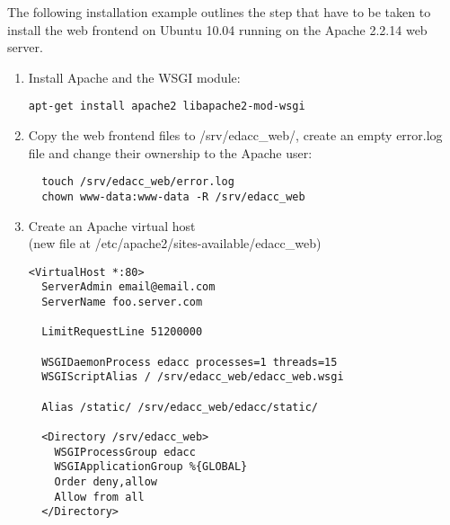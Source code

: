 The following installation example outlines the step that have to be taken to install the web frontend on Ubuntu 10.04
running on the Apache 2.2.14 web server.
\marginlabel{\Eexample}
\begin{enumerate}
\item Install Apache and the WSGI module: \begin{verbatim}apt-get install apache2 libapache2-mod-wsgi\end{verbatim}
\item{ Copy the web frontend files to /srv/edacc\_web/, create an empty error.log file and change their ownership to the Apache user: 
\begin{verbatim}
  touch /srv/edacc_web/error.log
  chown www-data:www-data -R /srv/edacc_web
\end{verbatim}
}
\item{ Create an Apache virtual host\\
(new file at /etc/apache2/sites-available/edacc\_web)
\begin{verbatim}
<VirtualHost *:80>
  ServerAdmin email@email.com
  ServerName foo.server.com

  LimitRequestLine 51200000

  WSGIDaemonProcess edacc processes=1 threads=15
  WSGIScriptAlias / /srv/edacc_web/edacc_web.wsgi

  Alias /static/ /srv/edacc_web/edacc/static/

  <Directory /srv/edacc_web>
    WSGIProcessGroup edacc
    WSGIApplicationGroup %{GLOBAL}
    Order deny,allow
    Allow from all
  </Directory>


\end{verbatim}}
\end{enumerate}
